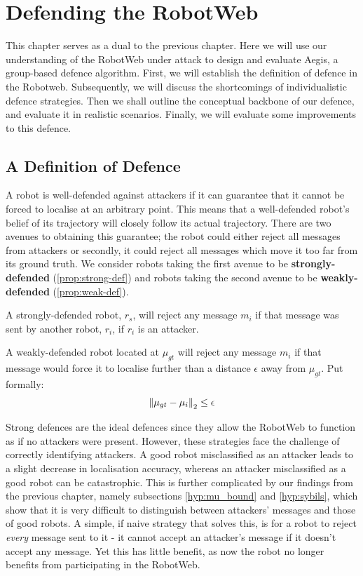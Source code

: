 \chapter{Defending the RobotWeb}
This chapter serves as a dual to the previous chapter. Here we will use our understanding of the RobotWeb under attack to design and evaluate Aegis, a group-based defence algorithm. First, we will establish the definition of defence in the Robotweb. Subsequently, we will discuss the shortcomings of individualistic defence strategies. Then we shall outline the conceptual backbone of our defence, and evaluate it in realistic scenarios. Finally, we will evaluate some improvements to this defence.

\section{A Definition of Defence}
A robot is well-defended against attackers if it can guarantee that it cannot be forced to localise at an arbitrary point. This means that a well-defended robot's belief of its trajectory will closely follow its actual trajectory. There are two avenues to obtaining this guarantee; the robot could either reject all messages from attackers or secondly, it could reject all messages which move it too far from its ground truth. We consider robots taking the first avenue to be \textbf{strongly-defended} (\autoref{prop:strong-def}) and robots taking the second avenue to be \textbf{weakly-defended} (\autoref{prop:weak-def}).

\begin{prop}
\label{prop:strong-def}
A strongly-defended robot, $r_s$, will reject any message $m_i$ if that message was sent by another robot, $r_i$, if $r_i$ is an attacker.
\end{prop}

\begin{prop}
\label{prop:weak-def}
A weakly-defended robot located at $\mu_{gt}$ will reject any message $m_i$ if that message would force it to localise further than a distance $\epsilon$ away from $\mu_{gt}$. Put formally: \[\left\lVert\mu_{gt} - \mu_i\right\rVert_2 \leq \epsilon\]
\end{prop}

Strong defences are the ideal defences since they allow the RobotWeb to function as if no attackers were present. However, these strategies face the challenge of correctly identifying attackers. A good robot misclassified as an attacker leads to a slight decrease in localisation accuracy, whereas an attacker misclassified as a good robot can be catastrophic. This is further complicated by our findings from the previous chapter, namely subsections \ref{hyp:mu_bound} and \ref{hyp:sybils}, which show that it is very difficult to distinguish between attackers' messages and those of good robots. A simple, if naive strategy that solves this, is for a robot to reject \emph{every} message sent to it - it cannot accept an attacker's message if it doesn't accept any message. Yet this has little benefit, as now the robot no longer benefits from participating in the RobotWeb.


